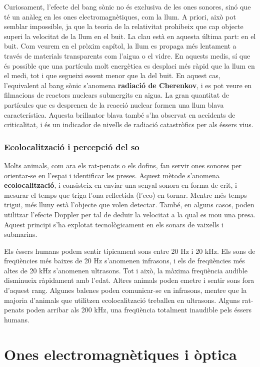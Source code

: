 \documentclass[12pt]{book}
\begin{document}
Curiosament, l'efecte del bang sònic no és exclusiva de les ones sonores, sinó que té un anàleg en les ones electromagnètiques, com la llum. A priori, això pot semblar impossible, ja que la teoria de la relativitat prohibeix que cap objecte superi la velocitat de la llum en el buit. La clau està en aquesta última part: en el buit. Com veurem en el pròxim capítol, la llum es propaga més lentament a través de materials transparents com l'aigua o el vidre. En aquests medis, sí que és possible que una partícula molt energètica es desplaci més ràpid que la llum en el medi, tot i que segueixi essent menor que la del buit. En aquest cas, l'equivalent al bang sònic s'anomena {\bf radiació de Cherenkov}, i es pot veure en filmacions de reactors nuclears submergits en aigua. La gran quantitat de partícules que es desprenen de la reacció nuclear formen una llum blava característica. Aquesta brillantor blava també s'ha observat en accidents de criticalitat, i és un indicador de nivells de radiació catastròfics per als éssers vius.

\subsection{Ecolocalització i percepció del so}

Molts animals, com ara els rat-penats o els dofins, fan servir ones sonores per orientar-se en l'espai i identificar les preses. Aquest mètode s'anomena {\bf ecolocalització}, i consisteix en enviar una senyal sonora en forma de crit, i mesurar el temps que triga l'ona reflectida (l'eco) en tornar. Mentre més temps trigui, més lluny està l'objecte que volen detectar. També, en alguns casos, poden utilitzar l'efecte Doppler per tal de deduir la velocitat a la qual es mou una presa. Aquest principi s'ha explotat tecnològicament en els sonars de vaixells i submarins.

Els éssers humans podem sentir típicament sons entre 20 Hz i 20 kHz. Els sons de freqüències més baixes de 20 Hz s'anomenen infrasons, i els de freqüències més altes de 20 kHz s'anomenen ultrasons. Tot i això, la màxima freqüència audible disminueix ràpidament amb l'edat. Altres animals poden emetre i sentir sons fora d'aquest rang. Algunes balenes poden comunicar-se en infrasons, mentre que la majoria d'animals que utilitzen ecolocalització treballen en ultrasons. Alguns rat-penats poden arribar als 200 kHz, una freqüència totalment inaudible pels éssers humans.


\chapter{Ones electromagnètiques i òptica}
\label{chap:OnesElectromagnetiques}
\end{document}
